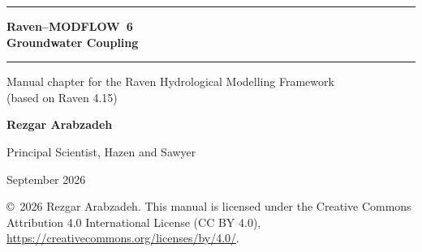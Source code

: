 \documentclass[11pt,a4paper]{report}
\begin{document}
\begin{titlepage}
\centering
\vspace*{3.5cm}
{\color{brand}\rule{\linewidth}{1.2pt}}\par\vspace{16pt}
{\sffamily\bfseries\fontsize{30}{38}\selectfont\color{brand}Raven--MODFLOW~6\\[4pt]Groundwater Coupling\par}
\vspace{14pt}
{\color{brand}\rule{\linewidth}{1.2pt}}\par\vspace{24pt}
{\large Manual chapter for the Raven Hydrological Modelling Framework\\[2pt](based on Raven 4.15)\par}
\vfill
{\sffamily\Large\bfseries Rezgar Arabzadeh\par}
\vspace{4pt}
{\large Principal Scientist, Hazen and Sawyer\par}
\vspace{2cm}
{\large September 2026\par}
\vspace{1.2cm}
{\footnotesize\color{gray!70!black}\copyright\ 2026 Rezgar Arabzadeh. This manual is licensed under the Creative Commons Attribution 4.0
International License (CC BY 4.0), \url{https://creativecommons.org/licenses/by/4.0/}.\par}
\end{titlepage}
\begingroup\small\tableofcontents\endgroup
\cleardoublepage
{}










\appendix

\cleardoublepage{}


\end{document}
